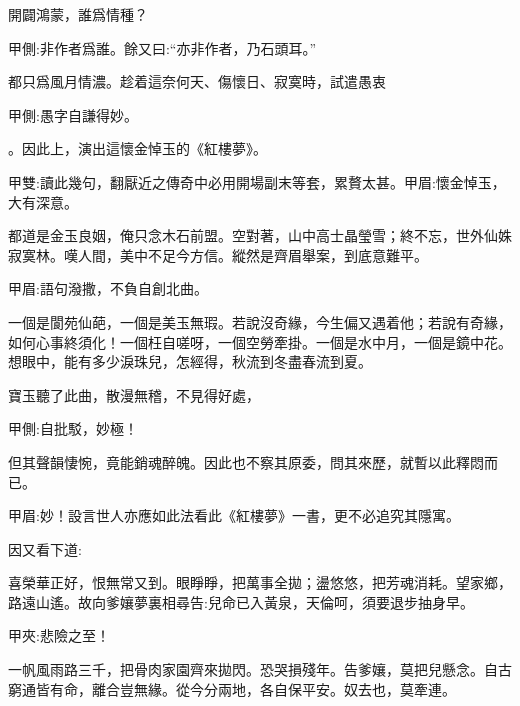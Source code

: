 \begin{qute2sp}
    開闢鴻蒙，誰爲情種？\begin{note}甲側:非作者爲誰。餘又曰:“亦非作者，乃石頭耳。”\end{note}都只爲風月情濃。趁着這奈何天、傷懷日、寂寞時，試遣愚衷\begin{note}甲側:愚字自謙得妙。\end{note}。因此上，演出這懷金悼玉的《紅樓夢》。\begin{note}甲雙:讀此幾句，翻厭近之傳奇中必用開場副末等套，累贅太甚。甲眉:懷金悼玉，大有深意。\end{note}
\end{qute2sp}


\begin{qute2sp}
    都道是金玉良姻，俺只念木石前盟。空對著，山中高士晶瑩雪；終不忘，世外仙姝寂寞林。嘆人間，美中不足今方信。縱然是齊眉舉案，到底意難平。\begin{note}甲眉:語句潑撒，不負自創北曲。\end{note}
\end{qute2sp}


\begin{qute2sp}
    一個是閬苑仙葩，一個是美玉無瑕。若說沒奇緣，今生偏又遇着他；若說有奇緣，如何心事終須化！一個枉自嗟呀，一個空勞牽掛。一個是水中月，一個是鏡中花。想眼中，能有多少淚珠兒，怎經得，秋流到冬盡春流到夏。
\end{qute2sp}


\begin{parag}
    寶玉聽了此曲，散漫無稽，不見得好處，\begin{note}甲側:自批駁，妙極！\end{note}但其聲韻悽惋，竟能銷魂醉魄。因此也不察其原委，問其來歷，就暫以此釋悶而已。\begin{note}甲眉:妙！設言世人亦應如此法看此《紅樓夢》一書，更不必追究其隱寓。\end{note}因又看下道:
\end{parag}


\begin{qute2sp}
    喜榮華正好，恨無常又到。眼睜睜，把萬事全拋；盪悠悠，把芳魂消耗。望家鄉，路遠山遙。故向爹孃夢裏相尋告:兒命已入黃泉，天倫呵，須要退步抽身早。\begin{note}甲夾:悲險之至！\end{note}
\end{qute2sp}


\begin{qute2sp}
    一帆風雨路三千，把骨肉家園齊來拋閃。恐哭損殘年。告爹孃，莫把兒懸念。自古窮通皆有命，離合豈無緣。從今分兩地，各自保平安。奴去也，莫牽連。
\end{qute2sp}


